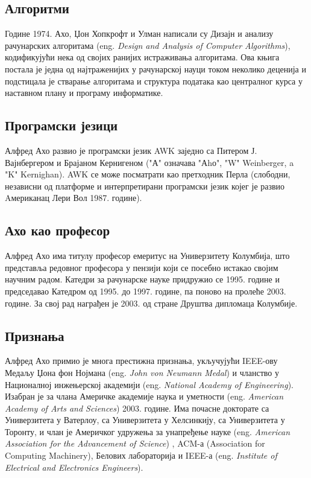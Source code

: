 \documentclass[a4paper]{article}
\begin{document}
\subsection{Алгоритми}
\label{subsec:podnaslov4}
Године 1974. Ахо, Џон Хопкрофт и Улман написали су Дизајн и анализу рачунарских алгоритама (eng. \emph{Design and Analysis of Computer Algorithms}), кодификујући нека од својих ранијих истраживања алгоритама. Ова књига постала је једна од најтраженијих у рачунарској науци током неколико деценија и подстицала је стварање алгоритама и структура података као централног курса у наставном плану и програму информатике. 

\subsection{Програмски језици}
\label{subsec:podnaslov5}
Алфред Ахо развио је програмски језик AWK заједно са Питером Ј. Вајнбергером и Брајаном Кернигеном ("А" означава "Аhо", "W" Weinberger, a "K" Kernighan). AWK се може посматрати као претходник Перла (слободни, независни од платформе и интерпретирани програмски језик којег је развио Aмериканац Лери Вол 1987. године).


\subsection{Ахо као професор}
\label{subsec:podnaslov6}
Алфред Ахо има титулу професор емеритус на Универзитету Колумбија, што представља редовног професора у пензији који се посебно истакао својим научним радом. Катедри за рачунарске науке придружио се 1995. године и председавао Катедром од 1995. до 1997. године, па поново на пролеће 2003. године. За свој рад награђен је 2003. од стране Друштва дипломаца Колумбије. 

\subsection{Признања}
\label{subsec:podnaslov7}
Алфред Ахо примио је многа престижна признања, укључујући IEEE-ову Медаљу Џона фон Нојмана (eng. \emph {John von Neumann Medal}) и чланство у Националној инжењерској академији (eng. \emph {National Academy of Engineering}). Изабран је за члана Америчке академије наука и уметности (eng. \emph {American Academy of Arts and Sciences}) 2003. године. Има почасне докторате са Универзитета у Ватерлоу, са Универзитета у Хелсинкију, са Универзитета у Торонту, и члан је Америчког удружења за унапређење науке (eng. \emph{American Association for the Advancement of Science}) , ACM-а (Association for Computing Machinery), Белових лабораторија и IEEE-а (eng. \emph {Institute of Electrical and Electronics Engineers}). 
\end{document}
